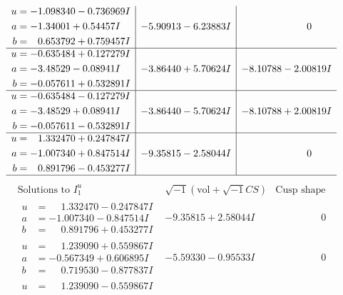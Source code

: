 \documentclass[1p]{elsarticle_modified}
\theoremstyle{definition}
\newcommand{\I}{\sqrt{-1}}
\begin{document}
$$\begin{array}{c|c|c}
\begin{aligned}
u &= -1.098340 - 0.736969 I \\
a &= -1.34001 + 0.54457 I \\
b &= \phantom{-}0.653792 + 0.759457 I\end{aligned}
 & -5.90913 - 6.23883 I & \phantom{-0.000000 } 0 \\ \hline\begin{aligned}
u &= -0.635484 + 0.127279 I \\
a &= -3.48529 - 0.08941 I \\
b &= -0.057611 + 0.532891 I\end{aligned}
 & -3.86440 + 5.70624 I & -8.10788 - 2.00819 I \\ \hline\begin{aligned}
u &= -0.635484 - 0.127279 I \\
a &= -3.48529 + 0.08941 I \\
b &= -0.057611 - 0.532891 I\end{aligned}
 & -3.86440 - 5.70624 I & -8.10788 + 2.00819 I \\ \hline\begin{aligned}
u &= \phantom{-}1.332470 + 0.247847 I \\
a &= -1.007340 + 0.847514 I \\
b &= \phantom{-}0.891796 - 0.453277 I\end{aligned}
 & -9.35815 - 2.58044 I & \phantom{-0.000000 } 0\\
 \hline 
 \end{array}$$\newpage$$\begin{array}{c|c|c}  
\text{Solutions to }I^u_{1}& \I (\text{vol} + \sqrt{-1}CS) & \text{Cusp shape}\\
 \hline 
\begin{aligned}
u &= \phantom{-}1.332470 - 0.247847 I \\
a &= -1.007340 - 0.847514 I \\
b &= \phantom{-}0.891796 + 0.453277 I\end{aligned}
 & -9.35815 + 2.58044 I & \phantom{-0.000000 } 0 \\ \hline\begin{aligned}
u &= \phantom{-}1.239090 + 0.559867 I \\
a &= -0.567349 + 0.606895 I \\
b &= \phantom{-}0.719530 - 0.877837 I\end{aligned}
 & -5.59330 - 0.95533 I & \phantom{-0.000000 } 0 \\ \hline\begin{aligned}
u &= \phantom{-}1.239090 - 0.559867 I \\

\end{aligned}
\end{array}$$
\end{document}
